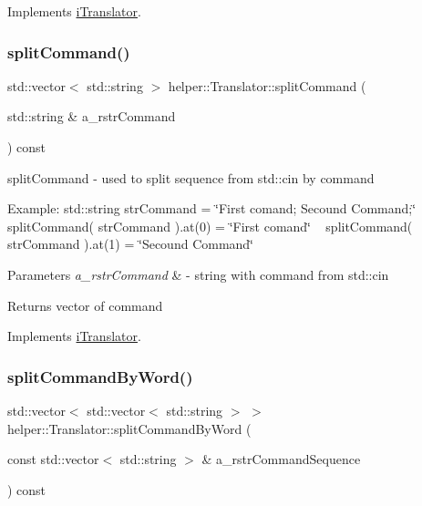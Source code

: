 Implements \mbox{\hyperlink{classi_translator}{i\+Translator}}.

\mbox{\label{classhelper_1_1_translator_acc87c03c71d988bb0f6e95e1bff839c8}} 
\subsubsection{\texorpdfstring{splitCommand()}{splitCommand()}}
{\footnotesize\ttfamily std\+::vector$<$ std\+::string $>$ helper\+::\+Translator\+::split\+Command (\begin{DoxyParamCaption}\item[{std\+::string \&}]{a\+\_\+rstr\+Command }\end{DoxyParamCaption}) const\hspace{0.3cm}{\ttfamily [virtual]}}



split\+Command -\/ used to split sequence from std\+::cin by command 

Example\+: std\+::string str\+Command = \char`\"{}\+First comand; Secound Command;\char`\"{} ~\newline
 split\+Command( str\+Command  ).at(0) = \char`\"{}\+First comand\char`\"{} ~\newline
 split\+Command( str\+Command  ).at(1) = \char`\"{}\+Secound Command\char`\"{}


\begin{DoxyParams}{Parameters}
{\em a\+\_\+rstr\+Command} & -\/ string with command from std\+::cin \\
\hline
\end{DoxyParams}
\begin{DoxyReturn}{Returns}
vector of command 
\end{DoxyReturn}


Implements \mbox{\hyperlink{classi_translator}{i\+Translator}}.

\mbox{\label{classhelper_1_1_translator_a1c4dfb9ff8a0a6d9453d7670a551fb61}} 
\subsubsection{\texorpdfstring{splitCommandByWord()}{splitCommandByWord()}}
{\footnotesize\ttfamily std\+::vector$<$ std\+::vector$<$ std\+::string $>$ $>$ helper\+::\+Translator\+::split\+Command\+By\+Word (\begin{DoxyParamCaption}\item[{const std\+::vector$<$ std\+::string $>$ \&}]{a\+\_\+rstr\+Command\+Sequence }\end{DoxyParamCaption}) const\hspace{0.3cm}{\ttfamily [virtual]}}



